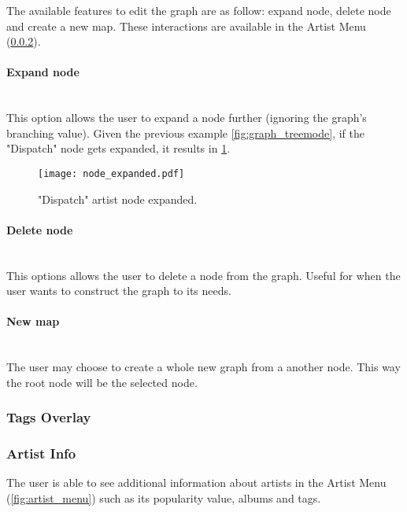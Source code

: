       The available features to edit the graph are as follow: expand node, delete node and create a new map.
      These interactions are available in the Artist Menu (\ref{ssub:artist_info}).

      \paragraph{Expand node} \hfill \\
      This option allows the user to expand a node further (ignoring the graph's branching value).
      Given the previous example \ref{fig:graph_treemode}, if the "Dispatch" node gets expanded, it results in \ref{fig:node_expanded}.

      \begin{figure}[tb]
         \begin{center}
           \texttt{[image: node\_expanded.pdf]}
         \end{center}
         \caption{"Dispatch" artist node expanded.}
         \label{fig:node_expanded}
      \end{figure}


      \paragraph{Delete node} \hfill \\
      This options allows the user to delete a node from the graph.
      Useful for when the user wants to construct the graph to its needs.

      \paragraph{New map} \hfill \\
      The user may choose to create a whole new graph from a another node.
      This way the root node will be the selected node.



    \subsubsection{Tags Overlay} %
      \label{ssub:tags_overlay}

      



    \subsubsection{Artist Info} %
      \label{ssub:artist_info}
      The user is able to see additional information about artists in the Artist Menu (\ref{fig:artist_menu}) such as its popularity value, albums and tags.

